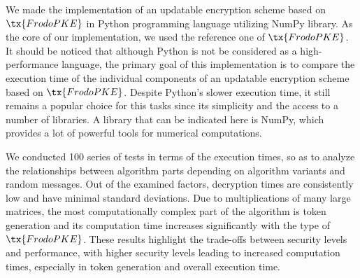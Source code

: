 \documentclass{fundam}
\begin{document}
\noindent We made the implementation of an updatable encryption scheme based on $\tx{FrodoPKE}$ in Python programming language utilizing NumPy library. As the core of our implementation, we used the reference one of $\tx{FrodoPKE}$. 
It should be noticed that although Python is not be considered as a high-performance language, the primary goal of this implementation is to compare the execution time of the individual components of an updatable encryption scheme based on $\tx{FrodoPKE}$. Despite Python's slower execution time, it still remains a popular choice for this tasks since its simplicity and the access to a number of libraries. A library that can be indicated here is NumPy, which provides a lot of powerful tools for numerical computations. 

\noindent We conducted 100 series of tests in terms of the execution times,  so as to analyze the relationships between algorithm parts depending on algorithm variants and random messages. Out of the examined factors, decryption times are consistently low and have minimal standard deviations. Due to multiplications of many large matrices, the most computationally complex part of the algorithm is token generation and its computation time increases significantly with the type of $\tx{FrodoPKE}$. These results highlight the trade-offs between security levels and performance, with higher security levels leading to increased computation times, especially in token generation and overall execution time.
\end{document}
